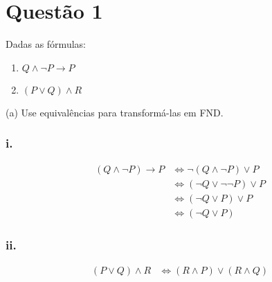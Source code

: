 \section*{Questão 1}

Dadas as fórmulas:

\begin{enumerate}[label=\roman*)]
    \item $Q \land \lnot P \rightarrow P$
    \item $(P \lor Q) \land R$
\end{enumerate}

\noindent
(a) Use equivalências para transformá-las em FND.

\subsubsection*{i.}
\begin{align*}
    (Q \land \lnot P) \rightarrow P
    &\Leftrightarrow \lnot (Q \land \lnot P) \lor P \\[6pt]
    &\Leftrightarrow (\lnot Q \lor \lnot \lnot P) \lor P \\[6pt]
    &\Leftrightarrow (\lnot Q \lor P) \lor P \\[6pt]
    &\Leftrightarrow (\lnot Q \lor P)
\end{align*}

\subsubsection*{ii.}
\begin{align*}
    (P \lor Q) \land R
    &\Leftrightarrow (R \land P) \lor (R \land Q)
\end{align*}